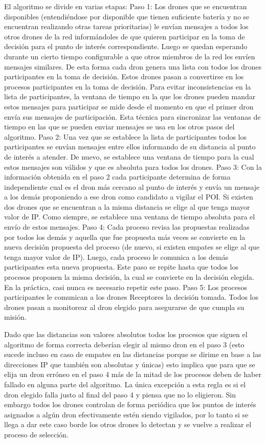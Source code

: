 El algoritmo se divide en varias etapas:
Paso 1: Los drones que se encuentran disponibles (entendiéndose por disponible que tienen suficiente batería y no se encuentran realizando otras tareas prioritarias) le envían mensajes a todos los otros drones de la red informándoles de que quieren participar en la toma de decisión para el punto de interés correspondiente. Luego se quedan esperando durante un cierto tiempo configurable a que otros miembros de la red les envíen mensajes similares. De esta forma cada dron genera una lista con todos los drones participantes en la toma de decisión. Estos drones pasan a convertirse en los procesos participantes en la toma de decisión. Para evitar inconsistencias en la lista de participantes, la ventana de tiempo en la que los drones pueden mandar estos mensajes para participar se mide desde el momento en que el primer dron envía sus mensajes de participación. Esta técnica para sincronizar las ventanas de tiempo en las que se pueden enviar mensajes se usa en los otros pasos del algoritmo.
Paso 2: Una vez que se establece la lista de participantes todos los participantes se envían mensajes entre ellos informando de su distancia al punto de interés a atender. De nuevo, se establece una ventana de tiempo para la cual estos mensajes son válidos y que es absoluta para todos los drones.
Paso 3: Con la información obtenida en el paso 2 cada participante determina de forma independiente cual es el dron más cercano al punto de interés y envía un mensaje a los demás proponiendo a ese dron como candidato a vigilar el POI. Si existen dos drones que se encuentran a la misma distancia se elige al que tenga mayor valor de IP. Como siempre, se establece una ventana de tiempo absoluta para el envío de estos mensajes.
Paso 4: Cada proceso revisa las propuestas realizadas por todos los demás y aquella que fue propuesta más veces se convierte en la nueva decisión propuesta del proceso (de nuevo, si existen empates se elige al que tenga mayor valor de IP). Luego, cada proceso le comunica a los demás participantes esta nueva propuesta. Este paso se repite hasta que todos los procesos proponen la misma decisión, la cual se convierte en la decisión elegida. En la práctica, casi nunca es necesario repetir este paso.
Paso 5: Los procesos participantes le comunican a los drones Receptores la decisión tomada. Todos los drones pasan a monitorear al dron elegido para asegurarse de que cumpla su misión.

Dado que las distancias son valores absolutos todos los procesos que siguen el algoritmo de forma correcta deberían elegir al mismo dron en el paso 3 (esto sucede incluso en caso de empates en las distancias porque se dirime en base a las direcciones IP que también son absolutas y únicas) esto implica que para que se elija un dron erróneo en el paso 4 más de la mitad de los procesos deben de haber fallado en alguna parte del algoritmo. La única excepción a esta regla es si el dron elegido falla justo al final del paso 4 y piensa que no lo eligieron. Sin embargo todos los drones controlan de forma periódica que los puntos de interés asignados a algún dron efectivamente estén siendo vigilados, por lo tanto si se llega a dar este caso borde los otros drones lo detectan y se vuelve a realizar el proceso de selección.

